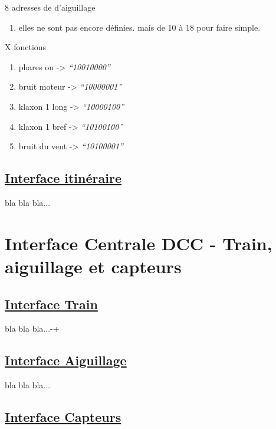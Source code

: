 \bigskip

8 adresses de d'aiguillage
\begin {enumerate}
\item elles ne sont pas encore définies. mais de 10 à 18 pour faire simple.
\end {enumerate}  

\bigskip

X fonctions
\begin {enumerate}
\item phares on     -> \emph{``10010000''}
\item bruit moteur  -> \emph{``10000001''}
\item klaxon 1 long -> \emph{``10000100''}
\item klaxon 1 bref -> \emph{``10100100''}
\item bruit du vent -> \emph{``10100001''}
\end {enumerate}  

\bigskip

\subsection{\underline{Interface itinéraire}}
\label{sec:ihm_iti}

bla bla bla...

\newpage

\section{Interface Centrale DCC - Train, aiguillage et capteurs}
\label{sec:int_dcc}

\subsection{\underline{Interface Train}}
\label{sec:int_train}

bla bla bla...-+

\subsection{\underline{Interface Aiguillage}}
\label{sec:int_aig}

bla bla bla...

\subsection{\underline{Interface Capteurs}}
\label{sec:int_cap}

